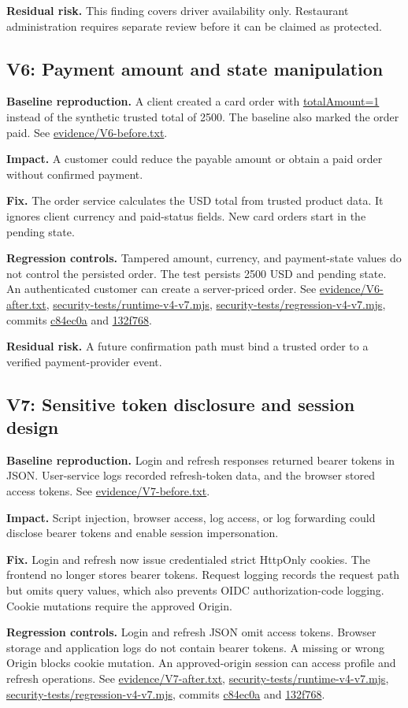\documentclass[11pt]{article}
\newcommand{\evidence}[1]{{\small\url{#1}}}
\newcommand{\finding}[1]{\subsection{#1}}
\newcommand{\baseline}{\textbf{Baseline reproduction.} }
\newcommand{\impact}{\textbf{Impact.} }
\newcommand{\fix}{\textbf{Fix.} }
\newcommand{\control}{\textbf{Regression controls.} }
\newcommand{\residual}{\textbf{Residual risk.} }
\begin{document}
\residual This finding covers driver availability only. Restaurant administration requires separate review before it can be claimed as protected.

\finding{V6: Payment amount and state manipulation}
\baseline A client created a card order with \evidence{totalAmount=1} instead of the synthetic trusted total of 2500. The baseline also marked the order paid. See \evidence{evidence/V6-before.txt}.

\impact A customer could reduce the payable amount or obtain a paid order without confirmed payment.

\fix The order service calculates the USD total from trusted product data. It ignores client currency and paid-status fields. New card orders start in the pending state.

\control Tampered amount, currency, and payment-state values do not control the persisted order. The test persists 2500 USD and pending state. An authenticated customer can create a server-priced order. See \evidence{evidence/V6-after.txt}, \evidence{security-tests/runtime-v4-v7.mjs}, \evidence{security-tests/regression-v4-v7.mjs}, commits \evidence{c84ec0a} and \evidence{132f768}.

\residual A future confirmation path must bind a trusted order to a verified payment-provider event.

\finding{V7: Sensitive token disclosure and session design}
\baseline Login and refresh responses returned bearer tokens in JSON. User-service logs recorded refresh-token data, and the browser stored access tokens. See \evidence{evidence/V7-before.txt}.

\impact Script injection, browser access, log access, or log forwarding could disclose bearer tokens and enable session impersonation.

\fix Login and refresh now issue credentialed strict HttpOnly cookies. The frontend no longer stores bearer tokens. Request logging records the request path but omits query values, which also prevents OIDC authorization-code logging. Cookie mutations require the approved Origin.

\control Login and refresh JSON omit access tokens. Browser storage and application logs do not contain bearer tokens. A missing or wrong Origin blocks cookie mutation. An approved-origin session can access profile and refresh operations. See \evidence{evidence/V7-after.txt}, \evidence{security-tests/runtime-v4-v7.mjs}, \evidence{security-tests/regression-v4-v7.mjs}, commits \evidence{c84ec0a} and \evidence{132f768}.
\end{document}
